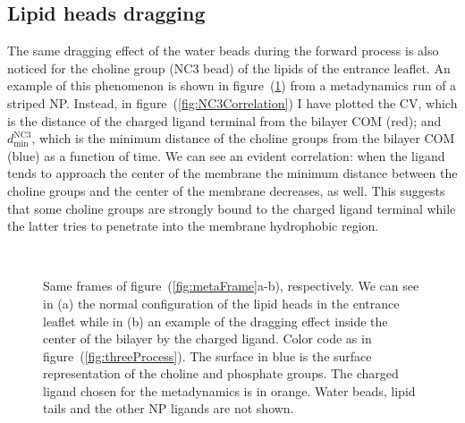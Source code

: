 \subsection{Lipid heads dragging}
The same dragging effect of the water beads during the forward process is also noticed for the choline group (NC$3$ \martini bead) of the lipids of the entrance leaflet. An example of this phenomenon is shown in figure~(\ref{fig:NC3Dragging}) from a metadynamics run of a striped \ac{NP}. Instead, in figure~(\ref{fig:NC3Correlation}) I have plotted the \ac{CV}, which is the distance of the charged ligand terminal from the bilayer \ac{COM} (red); and $d_\text{min}^{\text{NC}3}$, which is the minimum distance of the choline groups from the bilayer \ac{COM} (blue) as a function of time. We can see an evident correlation: when the ligand tends to approach the center of the membrane the minimum distance between the choline groups and the center of the membrane decreases, as well. This suggests that some choline groups are strongly bound to the charged ligand terminal while the latter tries to penetrate into the membrane hydrophobic region. 
\begin{figure}[!ht]
	\center
	\ %
	\caption{Same frames of figure~(\ref{fig:metaFrame}a-b), respectively. We can see in (a) the normal configuration of the lipid heads in the entrance leaflet while in (b) an example of the dragging effect inside the center of the bilayer by the charged ligand. Color code as in figure~(\ref{fig:threeProcess}). The surface in blue is the surface representation of the choline and phosphate groups. The charged ligand chosen for the metadynamics is in orange. Water beads, lipid tails and the other \acs{NP} ligands are not shown.}%
	\label{fig:NC3Dragging}
\end{figure}

